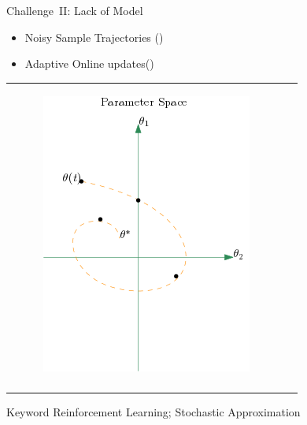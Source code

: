 \documentclass[10pt]{beamer}
\begin{document}
\begin{frame}[fragile]{Challenge~II: {Lack of Model}}
\begin{itemize}
\item Noisy Sample Trajectories ({\color{orange}{$s_0-a_0-s_1-a_1-\cdots$}})
\item Adaptive Online updates({\color{orange}{$\theta(0),\theta(1),\ldots, \theta(t)$}})
\end{itemize}
\begin{table}
\begin{tabular}{cc}
\begin{minipage}{0.5\textwidth}
\begin{figure}
\includegraphics[scale=0.4]{traj.png}
\end{figure}
\end{minipage}
&
\begin{minipage}{0.5\textwidth}
\begin{block}{Open Question}
{\color{orange}{Stability?}}\\
{\color{orange}{$\theta(t)\ra \theta^*$ ?}}
\end{block}
\end{minipage}
\end{tabular}
\end{table}
\begin{block}{Keyword}
Reinforcement Learning; Stochastic Approximation
\end{block}

\end{frame}
\end{document}
